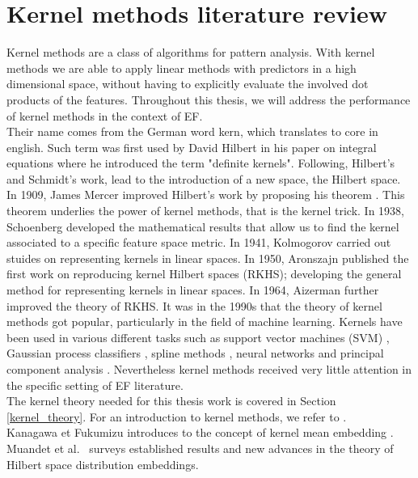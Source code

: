 \section{Kernel methods literature review}
Kernel methods are a class of algorithms for pattern analysis.
With kernel methods we are able to apply linear methods with predictors in a high dimensional space, without having to explicitly evaluate the involved dot products of the features.
Throughout this thesis, we will address the performance of kernel methods in the context of EF.
\\
Their name comes from the German word kern, which translates to core in english. Such term was first used by David Hilbert in his paper on integral equations \cite{hilbert} where he introduced the term "definite kernels". Following, Hilbert's and Schmidt's work, \cite{schmidt} lead to the introduction of a new space, the Hilbert space.
In 1909, James Mercer improved Hilbert's work by proposing his theorem \cite{mercer}. This theorem underlies the power of kernel methods, that is the kernel trick.
In 1938, Schoenberg \cite{schoenberg} developed the mathematical results that allow us to find the kernel associated to a specific feature space metric.
In 1941, Kolmogorov \cite{kolmogorov} carried out stuides on representing kernels in linear spaces.
In 1950, Aronszajn \cite{aronszajn} published the first work on reproducing kernel Hilbert spaces (RKHS); developing the general method for representing kernels in linear spaces.
In 1964, Aizerman \cite{aizerman} further improved the theory of RKHS.
It was in the 1990s that the theory of kernel methods got popular, particularly in the field of machine learning. Kernels have been used in various different tasks such as support vector machines (SVM) \cite{vapnik1} \cite{vapnik2}, Gaussian process classifiers \cite{williams}, spline methods \cite{wahba}, neural networks \cite{poggio} and principal component analysis \cite{pca_scholkopf}.
Nevertheless kernel methods received very little attention in the specific setting of EF literature.
\\
The kernel theory needed for this thesis work is covered in Section \ref{kernel_theory}. 
For an introduction to kernel methods, we refer to \cite{learning_with_kernels, hofmann2006review, shawe2004kernel}.
\\
Kanagawa et Fukumizu introduces to the concept of kernel mean embedding \cite{pmlr}. Muandet et al.\ \cite{Muandet_2017} surveys established results and new advances in the theory of Hilbert space distribution embeddings. 
